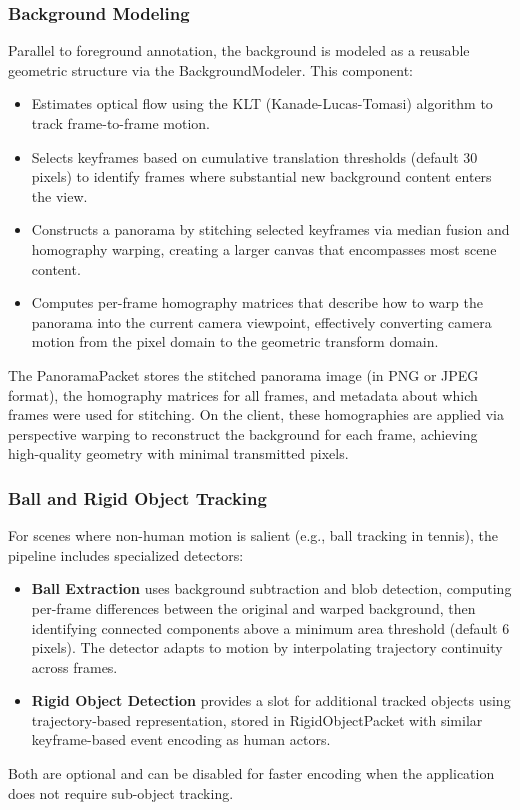 \documentclass[manuscript, screen]{acmart}
\begin{document}
\subsubsection{Background Modeling}
Parallel to foreground annotation, the background is modeled as a reusable geometric structure via the BackgroundModeler. This component:
\begin{itemize}[topsep=0pt,itemsep=0pt,leftmargin=*]
    \item Estimates optical flow using the KLT (Kanade-Lucas-Tomasi) algorithm to track frame-to-frame motion.
    \item Selects keyframes based on cumulative translation thresholds (default 30 pixels) to identify frames where substantial new background content enters the view.
    \item Constructs a panorama by stitching selected keyframes via median fusion and homography warping, creating a larger canvas that encompasses most scene content.
    \item Computes per-frame homography matrices that describe how to warp the panorama into the current camera viewpoint, effectively converting camera motion from the pixel domain to the geometric transform domain.
\end{itemize}
The PanoramaPacket stores the stitched panorama image (in PNG or JPEG format), the homography matrices for all frames, and metadata about which frames were used for stitching. On the client, these homographies are applied via perspective warping to reconstruct the background for each frame, achieving high-quality geometry with minimal transmitted pixels.

\subsubsection{Ball and Rigid Object Tracking}
For scenes where non-human motion is salient (e.g., ball tracking in tennis), the pipeline includes specialized detectors:
\begin{itemize}[topsep=0pt,itemsep=0pt,leftmargin=*]
    \item \textbf{Ball Extraction} uses background subtraction and blob detection, computing per-frame differences between the original and warped background, then identifying connected components above a minimum area threshold (default 6 pixels). The detector adapts to motion by interpolating trajectory continuity across frames.
    \item \textbf{Rigid Object Detection} provides a slot for additional tracked objects using trajectory-based representation, stored in RigidObjectPacket with similar keyframe-based event encoding as human actors.
\end{itemize}
Both are optional and can be disabled for faster encoding when the application does not require sub-object tracking.
\end{document}
